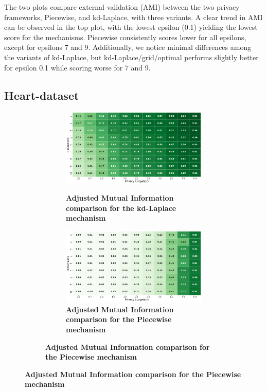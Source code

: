 The two plots compare external validation (AMI) between the two privacy frameworks, Piecewise, and kd-Laplace, with three variants.
A clear trend in AMI can be observed in the top plot, with the lowest epsilon (0.1) yielding the lowest score for the mechanisms.
Piecewise consistently scores lower for all epsilons, except for epsilons 7 and 9.
Additionally, we notice minimal differences among the variants of kd-Laplace, but kd-Laplace/grid/optimal performs slightly better for epsilon 0.1 while scoring worse for 7 and 9.
\newpage
\subsection{Heart-dataset}
\begin{figure}[H]
    \centering
    \begin{subfigure}[b]{0.80\textwidth}
        \begin{subfigure}[c]{1\textwidth}
            \caption{\textbf{Adjusted Mutual Information comparison for the kd-Laplace mechanism}}
            \includegraphics[width=1\textwidth]{Results/kd-laplace/kd-Laplace/heart-dataset/ami.png}
            \label{fig:ami_heart-dataset_comparison_kdlaplace_2d}
        \end{subfigure}
        \vfill %
        \begin{subfigure}[c]{1\textwidth}
            \caption{\textbf{Adjusted Mutual Information comparison for the Piecewise mechanism}}
            \includegraphics[width=1\textwidth]{Results/kd-laplace/piecewise/heart-dataset/ami.png}

\end{subfigure}
\end{subfigure}
\end{figure}
